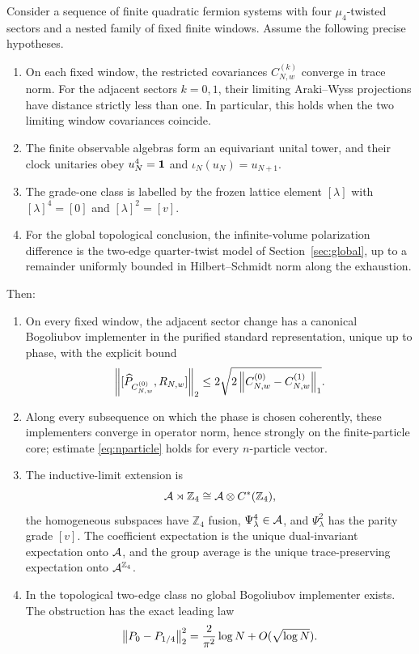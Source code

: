 \begin{theorem}\label{thm:main}
Consider a sequence of finite quadratic fermion systems with four
$\mu_4$-twisted sectors and a nested family of fixed finite windows.
Assume the following precise hypotheses.
\begin{enumerate}[label=(H\arabic*)]
\item On each fixed window, the restricted covariances
$C_{N,w}^{(k)}$ converge in trace norm.  For the adjacent sectors
$k=0,1$, their limiting Araki--Wyss projections have distance strictly
less than one.  In particular, this holds when the two limiting window
covariances coincide.
\item The finite observable algebras form an equivariant unital tower,
and their clock unitaries obey
$u_N^4=\mathbf 1$ and $\iota_N(u_N)=u_{N+1}$.
\item The grade-one class is labelled by the frozen lattice element
$[\lambda]$ with $[\lambda]^4=[0]$ and $[\lambda]^2=[v]$.
\item For the global topological conclusion, the infinite-volume
polarization difference is the two-edge quarter-twist model of
Section~\ref{sec:global}, up to a remainder uniformly bounded in
Hilbert--Schmidt norm along the exhaustion.
\end{enumerate}
Then:
\begin{enumerate}[label=\textup{(\alph*)}]
\item On every fixed window, the adjacent sector change has a canonical
Bogoliubov implementer in the purified standard representation, unique
up to phase, with the explicit bound
\[
\left\lVert [\widehat P_{C_{N,w}^{(0)}},R_{N,w}]\right\rVert_2
\le2\sqrt{2\left\lVert C_{N,w}^{(0)}-C_{N,w}^{(1)}\right\rVert_1}.
\]
\item Along every subsequence on which the phase is chosen coherently,
these implementers converge in operator norm, hence strongly on the
finite-particle core; estimate \eqref{eq:nparticle} holds for every
$n$-particle vector.
\item The inductive-limit extension is
\[
\mathcal A\rtimes\mathbb Z_4\cong\mathcal A\otimes C^*(\mathbb Z_4),
\]
the homogeneous subspaces have $\mathbb Z_4$ fusion,
$\Psi_\lambda^4\in\mathcal A$, and $\Psi_\lambda^2$ has the parity grade
$[v]$.  The coefficient expectation is the unique dual-invariant
expectation onto $\mathcal A$, and the group average is the unique
trace-preserving expectation onto $\mathcal A^{\mathbb Z_4}$.
\item In the topological two-edge class no global Bogoliubov implementer
exists.  The obstruction has the exact leading law
\[
\left\lVert P_0-P_{1/4}\right\rVert_2^2
=\frac2{\pi^2}\log N+O(\sqrt{\log N}).
\]
\end{enumerate}
\end{theorem}

